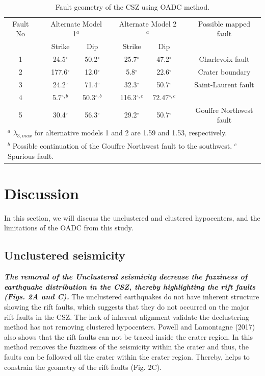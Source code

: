 \documentclass[draft]{agujournal2018}
\begin{document}
   \begin{table}
    \caption{Fault geometry of the CSZ using OADC method.}
    \centering
    \begin{tabular}{ccccccccc}
    \hline
    Fault No &   & \multicolumn{2}{c}{Alternate Model 1$^{a}$} & &  \multicolumn{2}{c}{Alternate Model 2$^{a}$} & &  Possible mapped fault \\
     && Strike & Dip  & & Strike & Dip & & \\
    \hline
    1 & & 24.5$^\circ$ & 50.2$^\circ$ &   &     25.7$^\circ$ & 47.2$^\circ$&  &Charlevoix fault \\
    2 & & 177.6$^\circ$ & 12.0$^\circ$ & & 	5.8$^\circ$ & 22.6$^\circ$&  &Crater boundary  \\
    3 & & 24.2$^\circ$ & 71.4$^\circ$ & 	 &	32.3$^\circ$ & 50.7$^\circ$& & Saint-Laurent fault\\
    4 &  &5.7$^{\circ,b}$ & 50.3$^{\circ,b}$ &  &		116.3$^{\circ,c}$ & 72.47$^{\circ,c}$& &  \\
    5 &  &30.4$^\circ$ & 56.3$^\circ$ & 	 &	29.2$^\circ$ & 50.7$^\circ$&  &Gouffre Northwest fault\\
    \hline
     \multicolumn{9}{l}{$^{a}$ $\lambda_{3,max}$ for alternative models 1 and 2 are 1.59 and 1.53, respectively.}\\
    \multicolumn{9}{l}{$^{b}$ Possible continuation of the Gouffre Northwest fault to the southwest. $^{c}$ Spurious fault.}
    \end{tabular}
    \label{tableone}
    \end{table}


\section{Discussion}
In this section, we will discuss the unclustered and clustered hypocenters, and the limitations of the OADC from this study.

\subsection{Unclustered seismicity}
\textit{\textbf{The removal of the Unclustered seismicity decrease the fuzziness of earthquake distribution in the CSZ, thereby highlighting the rift faults (Figs. 2A and C).}} The unclustered earthquakes do not have inherent structure showing the rift faults, which suggests that they do not occurred on the major rift faults in the CSZ. The lack of inherent alignment validate the declustering method has not removing clustered hypocenters. Powell and Lamontagne (2017) also shows that the rift faults can not be traced inside the crater region. In this method removes the fuzziness of the seismicity within the crater and thus, the faults can be followed all the crater within the crater region. Thereby, helps to constrain the geometry of the rift faults (Fig. 2C).
\end{document}
